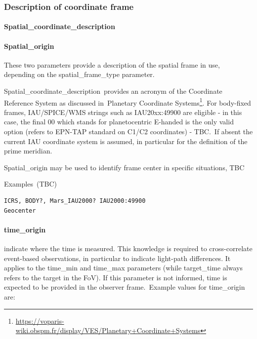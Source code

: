 \documentclass[11pt,a4paper]{ivoa}
\begin{document}
\subsubsection{Description of coordinate frame}

\paragraph{Spatial\_coordinate\_description}

\paragraph{Spatial\_origin}

These two parameters provide a description of the spatial frame in use, depending on the spatial\_frame\_type parameter. 

Spatial\_coordinate\_description provides an acronym of the Coordinate Reference System as discussed in Planetary Coordinate Systems\footnote{\url{https://voparis-wiki.obspm.fr/display/VES/Planetary+Coordinate+Systems}}. For body-fixed frames, IAU/SPICE/WMS strings such as IAU20xx:49900 are eligible - in this case, the final 00 which stands for planetocentric E-handed is the only valid option (refers to EPN-TAP standard on C1/C2 coordinates) - TBC. If absent the current IAU coordinate system is assumed, in particular for the definition of the prime meridian. 

Spatial\_origin may be used to identify frame center in specific situations, TBC

Examples (TBC)






\begin{verbatim}
ICRS, BODY?, Mars_IAU2000? IAU2000:49900
Geocenter
\end{verbatim}




\paragraph{time\_origin}

indicate where the time is measured. This knowledge is required to cross-correlate event-based observations, in particular to indicate light-path differences. It applies to the time\_min and time\_max parameters (while target\_time always refers to the target in the FoV). If this parameter is not informed, time is expected to be provided in the observer frame. Example values for time\_origin are:
\end{document}
